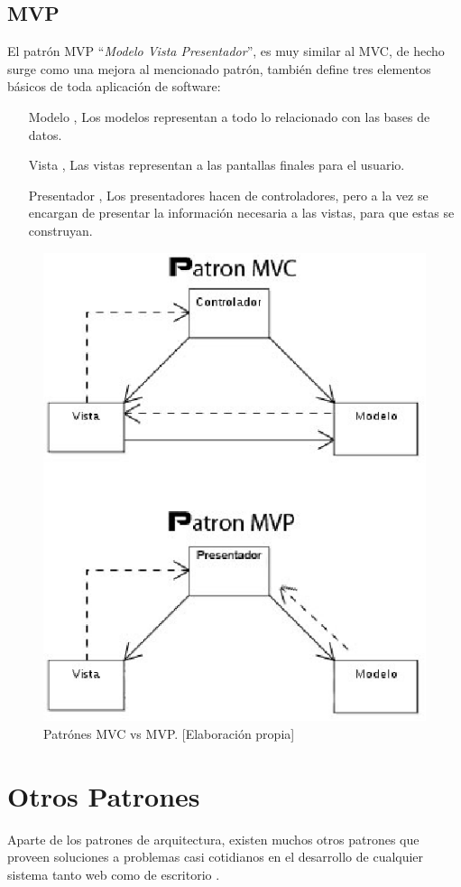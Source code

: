 \subsection{MVP}
El patr\'on MVP ``\emph{Modelo Vista Presentador}'', es muy similar al MVC, de hecho surge como una mejora al mencionado patr\'on, tambi\'en define tres elementos b\'asicos de toda aplicaci\'on de software:
\begin{itemize}
\item[Modelo], Los modelos representan a todo lo relacionado con las bases de datos.
\item[Vista], Las vistas representan a las pantallas finales para el usuario.
\item[Presentador], Los presentadores hacen de controladores, pero a la vez se encargan de presentar la informaci\'on necesaria a las vistas, para que estas se construyan.
\end{itemize}

\begin{figure}[h]
\centering
\includegraphics[scale=.7, keepaspectratio=true]{imagenes/11_imagen.png}
\caption{Patr\'ones MVC vs MVP. [Elaboraci\'on propia]}
\end{figure}

\section{Otros Patrones}
Aparte de los patrones de arquitectura, existen muchos otros patrones que proveen soluciones a problemas casi cotidianos en el desarrollo de cualquier sistema tanto web como de escritorio \cite{design_patterns}.\\

